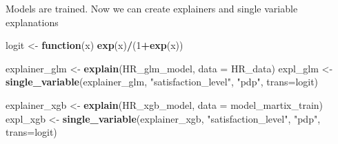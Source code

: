 \documentclass[]{book}
\newenvironment{Shaded}{\begin{snugshade}}{\end{snugshade}}
\newcommand{\KeywordTok}[1]{\textcolor[rgb]{0.13,0.29,0.53}{\textbf{#1}}}
\newcommand{\DataTypeTok}[1]{\textcolor[rgb]{0.13,0.29,0.53}{#1}}
\newcommand{\DecValTok}[1]{\textcolor[rgb]{0.00,0.00,0.81}{#1}}
\newcommand{\StringTok}[1]{\textcolor[rgb]{0.31,0.60,0.02}{#1}}
\newcommand{\ControlFlowTok}[1]{\textcolor[rgb]{0.13,0.29,0.53}{\textbf{#1}}}
\newcommand{\OperatorTok}[1]{\textcolor[rgb]{0.81,0.36,0.00}{\textbf{#1}}}
\newcommand{\NormalTok}[1]{#1}
\theoremstyle{definition}
\theoremstyle{definition}
\theoremstyle{definition}
\theoremstyle{remark}
\begin{document}
\begin{Shaded}
\end{Shaded}

Models are trained. Now we can create explainers and single variable
explanations

\begin{Shaded}
\begin{Highlighting}[]
\NormalTok{logit <-}\StringTok{ }\ControlFlowTok{function}\NormalTok{(x) }\KeywordTok{exp}\NormalTok{(x)}\OperatorTok{/}\NormalTok{(}\DecValTok{1}\OperatorTok{+}\KeywordTok{exp}\NormalTok{(x))}

\NormalTok{explainer_glm <-}\StringTok{ }\KeywordTok{explain}\NormalTok{(HR_glm_model, }\DataTypeTok{data =}\NormalTok{ HR_data)}
\NormalTok{expl_glm <-}\StringTok{ }\KeywordTok{single_variable}\NormalTok{(explainer_glm, }\StringTok{"satisfaction_level"}\NormalTok{, }\StringTok{"pdp"}\NormalTok{, }\DataTypeTok{trans=}\NormalTok{logit)}

\NormalTok{explainer_xgb <-}\StringTok{ }\KeywordTok{explain}\NormalTok{(HR_xgb_model, }\DataTypeTok{data =}\NormalTok{ model_martix_train)}
\NormalTok{expl_xgb <-}\StringTok{ }\KeywordTok{single_variable}\NormalTok{(explainer_xgb, }\StringTok{"satisfaction_level"}\NormalTok{, }\StringTok{"pdp"}\NormalTok{, }\DataTypeTok{trans=}\NormalTok{logit)}
\end{Highlighting}
\end{Shaded}
\end{document}
